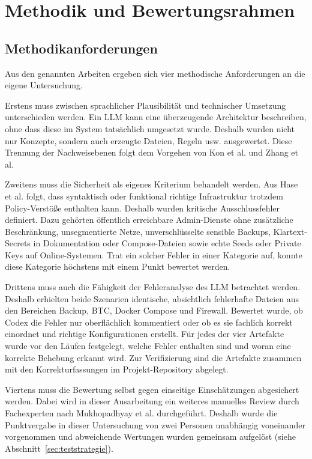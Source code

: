 \section{Methodik und Bewertungsrahmen}

\subsection{Methodikanforderungen} \label{subsec:methodikanforderungen}

Aus den genannten Arbeiten ergeben sich vier methodische Anforderungen an die eigene Untersuchung.

Erstens muss zwischen sprachlicher Plausibilität und technischer Umsetzung unterschieden werden. Ein \ac{LLM} kann eine überzeugende Architektur beschreiben, ohne dass diese im System tatsächlich umgesetzt wurde. Deshalb wurden nicht nur Konzepte, sondern auch erzeugte Dateien, Regeln usw. ausgewertet. Diese Trennung der Nachweisebenen folgt dem Vorgehen von Kon et al. und Zhang et al.\cite{kon2024iaceval,zhang2025deployabilitycentriciac}

Zweitens muss die Sicherheit als eigenes Kriterium behandelt werden. Aus Hase et al. folgt, dass syntaktisch oder funktional richtige Infrastruktur trotzdem Policy-Verstöße enthalten kann.\cite{hase2026securitypolicyiac} Deshalb wurden kritische Ausschlussfehler definiert. Dazu gehörten öffentlich erreichbare Admin-Dienste ohne zusätzliche Beschränkung, unsegmentierte Netze, unverschlüsselte sensible Backups, Klartext-Secrets in Dokumentation oder Compose-Dateien sowie echte Seeds oder Private Keys auf Online-Systemen. Trat ein solcher Fehler in einer Kategorie auf, konnte diese Kategorie höchstens mit einem Punkt bewertet werden.

Drittens muss auch die Fähigkeit der Fehleranalyse des \ac{LLM} betrachtet werden. Deshalb erhielten beide Szenarien identische, absichtlich fehlerhafte Dateien aus den Bereichen Backup, \ac{BTC}, Docker Compose und Firewall. Bewertet wurde, ob Codex die Fehler nur oberflächlich kommentiert oder ob es sie fachlich korrekt einordnet und richtige Konfigurationen erstellt.
Für jedes der vier Artefakte wurde vor den Läufen festgelegt, welche Fehler enthalten sind und woran eine korrekte Behebung erkannt wird. Zur Verifizierung sind die Artefakte zusammen mit den Korrekturfassungen im Projekt-Repository abgelegt.\cite{ki_eval_github}

Viertens muss die Bewertung selbst gegen einseitige Einschätzungen abgesichert werden. Dabei wird in dieser Ausarbeitung ein weiteres manuelles Review durch Fachexperten nach Mukhopadhyay et al. durchgeführt.\cite{KIIaC} Deshalb wurde die Punktvergabe in dieser Untersuchung von zwei Personen unabhängig voneinander vorgenommen und abweichende Wertungen wurden gemeinsam aufgelöst (siehe Abschnitt~\ref{sec:teststrategie}).


